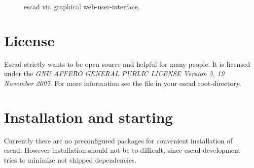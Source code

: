 \documentclass[a4paper, 12pt, openany]{scrbook}
\begin{document}
\begin{figure}[htbp]
  \centering
  \caption{escad via graphical web-user-interface.}
  \label{fig:escad_gui}
\end{figure}
\section{License}
Escad strictly wants to be open source and helpful for many people. It is licensed under the \emph{GNU AFFERO GENERAL PUBLIC LICENSE Version 3, 19 November 2007}. For more information see the file  in your escad root-directory.
\section{Installation and starting}
Currently there are no preconfigured packages for convenient installation of escad. However installation should not be to difficult, since escad-development tries to minimize not shipped dependencies.
\end{document}
